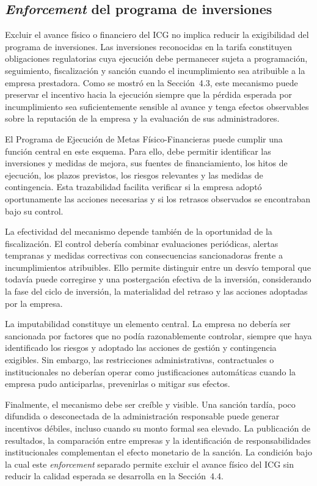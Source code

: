 \subsection{\textit{Enforcement} del programa de inversiones}

Excluir el avance físico o financiero del ICG no implica reducir la exigibilidad del programa de inversiones. Las inversiones reconocidas en la tarifa constituyen obligaciones regulatorias cuya ejecución debe permanecer sujeta a programación, seguimiento, fiscalización y sanción cuando el incumplimiento sea atribuible a la empresa prestadora. Como se mostró en la Sección~4.3, este mecanismo puede preservar el incentivo hacia la ejecución siempre que la pérdida esperada por incumplimiento sea suficientemente sensible al avance y tenga efectos observables sobre la reputación de la empresa y la evaluación de sus administradores.

El Programa de Ejecución de Metas Físico-Financieras puede cumplir una función central en este esquema. Para ello, debe permitir identificar las inversiones y medidas de mejora, sus fuentes de financiamiento, los hitos de ejecución, los plazos previstos, los riesgos relevantes y las medidas de contingencia. Esta trazabilidad facilita verificar si la empresa adoptó oportunamente las acciones necesarias y si los retrasos observados se encontraban bajo su control.

La efectividad del mecanismo depende también de la oportunidad de la fiscalización. El control debería combinar evaluaciones periódicas, alertas tempranas y medidas correctivas con consecuencias sancionadoras frente a incumplimientos atribuibles. Ello permite distinguir entre un desvío temporal que todavía puede corregirse y una postergación efectiva de la inversión, considerando la fase del ciclo de inversión, la materialidad del retraso y las acciones adoptadas por la empresa.

La imputabilidad constituye un elemento central. La empresa no debería ser sancionada por factores que no podía razonablemente controlar, siempre que haya identificado los riesgos y adoptado las acciones de gestión y contingencia exigibles. Sin embargo, las restricciones administrativas, contractuales o institucionales no deberían operar como justificaciones automáticas cuando la empresa pudo anticiparlas, prevenirlas o mitigar sus efectos.

Finalmente, el mecanismo debe ser creíble y visible. Una sanción tardía, poco difundida o desconectada de la administración responsable puede generar incentivos débiles, incluso cuando su monto formal sea elevado. La publicación de resultados, la comparación entre empresas y la identificación de responsabilidades institucionales complementan el efecto monetario de la sanción. La condición bajo la cual este \textit{enforcement} separado permite excluir el avance físico del ICG sin reducir la calidad esperada se desarrolla en la Sección~4.4.

